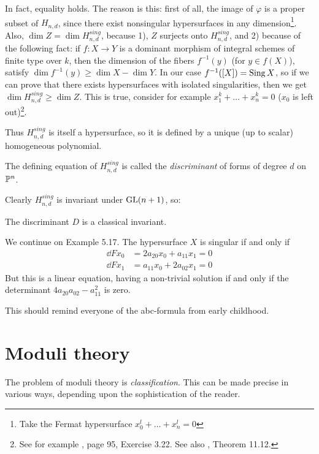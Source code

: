 \documentclass[11pt, english]{article}
\begin{document}
In fact, equality holds. The reason is this: first of all, the image of $\varphi$ is a proper subset of $H_{n,d}$, since there exist nonsingular hypersurfaces in any dimension\footnote{Take the Fermat hypersurface $x_0^l+\ldots+x_n^l=0$}. Also, $\dim Z = \dim H_{n,d}^{sing}$, because 1), $Z$ surjects onto $H_{n,d}^{sing}$, and 2) because of the following fact: if $f:X \to Y$ is a dominant morphism of integral schemes of finite type over $k$, then the dimension of the fibers $f^{-1}(y)$ (for $y \in f(X)$), satisfy $\dim f^{-1}(y) \geq \dim X - \dim Y$. In our case $f^{-1}([X])=\operatorname{Sing} X$, so if we can prove that there exists hypersurfaces with isolated singularities, then we get $\dim H_{n,d}^{sing} \geq \dim Z$. This is true, consider for example $x_1^k+\ldots+x_n^k=0$ ($x_0$ is left out)\footnote{See for example \cite{hartshorne}, page 95, Exercise 3.22. See also \cite{harris_alggeo}, Theorem 11.12.}.

Thus $H_{n,d}^{sing}$ is itself a hypersurface, so it is defined by a unique (up to scalar)  homogeneous polynomial.

\begin{defi}
 The defining equation of $H_{n,d}^{sing}$ is called the \emph{discriminant} of forms of degree $d$ on $\mathbb{P}^n$.
\end{defi}

Clearly $H_{n,d}^{sing}$ is invariant under $\operatorname{GL}(n+1)$, so:
\begin{corr}
 The discriminant $D$ is a classical invariant.
\end{corr}

\begin{example}
We continue on Example 5.17. The hypersurface $X$ is singular if and only if
\begin{align*}
  \dd{F}{x_0} &= 2a_{20}x_0 + a_{11}x_1 = 0 \\
\dd{F}{x_1} &= a_{11}x_0 + 2a_{02} x_1 = 0
\end{align*}
But this is a linear equation, having a non-trivial solution if and only if the determinant $4a_{20}a_{02}-a_{11}^2$ is zero.

This should remind everyone of the abc-formula from early childhood.
\end{example}

\section{Moduli theory}

The problem of moduli theory is \emph{classification}. This can be made precise in various ways, depending upon the sophistication of the reader.
\end{document}
